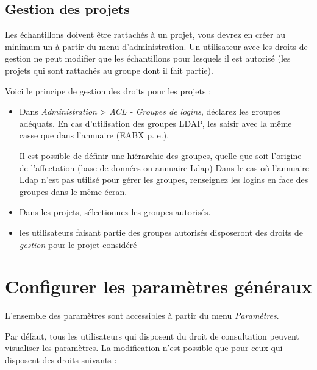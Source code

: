 \subsection{Gestion des projets}

Les échantillons doivent être rattachés à un projet, vous devrez en créer au minimum un à partir du menu d'administration. Un utilisateur avec les droits de gestion ne peut modifier que les échantillons pour lesquels il est autorisé (les projets qui sont rattachés au groupe dont il fait partie).

Voici le principe de gestion des droits pour les projets :
\begin{itemize}
\item Dans \textit{Administration} > \textit{ACL - Groupes de logins}, déclarez les groupes adéquats. En cas d'utilisation des groupes LDAP, les saisir avec la même casse que dans l'annuaire (EABX p. e.).

Il est possible de définir une hiérarchie des groupes, quelle que soit l'origine de l'affectation (base de données ou annuaire Ldap)
Dans le cas où l'annuaire Ldap n'est pas utilisé pour gérer les groupes, renseignez les logins en face des groupes dans le même écran.

\item Dans les projets, sélectionnez les groupes autorisés.
\item les utilisateurs faisant partie des groupes autorisés disposeront des droits de \textit{gestion} pour le projet considéré
\end{itemize}

\section{Configurer les paramètres généraux}
\label{param}
L'ensemble des paramètres sont accessibles à partir du menu \textit{Paramètres}. 

Par défaut, tous les utilisateurs qui disposent du droit de consultation peuvent visualiser les paramètres. La modification n'est possible que pour ceux qui disposent des droits suivants :

